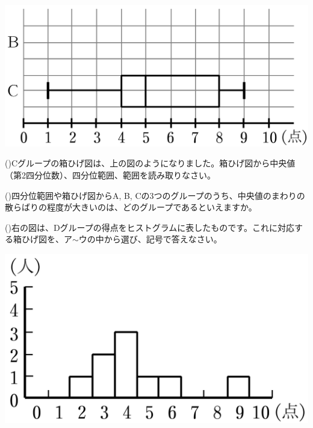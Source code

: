 \documentclass[
  12pt,a4paper,lualatex,ja=standard]{bxjsarticle}
\begin{document}
\begin{flushleft}
\begin{center}
\def\@captype{figure}
\includegraphics{img/image1.png}


\end{center}

\vspace{5mm}

()\hspace{2.5pt}Cグループの箱ひげ図は、上の図のようになりました。箱ひげ図から中央値（第2四分位数）、四分位範囲、範囲を読み取りなさい。

\vfill

()\hspace{2.5pt}四分位範囲や箱ひげ図からA, B, Cの3つのグループのうち、中央値のまわりの散らばりの程度が大きいのは、どのグループであるといえますか。

\vfill

\begin{multicols}{3}
()\hspace{2.5pt}右の図は、Dグループの得点をヒストグラムに表したものです。これに対応する箱ひげ図を、ア$\sim$ウの中から選び、記号で答えなさい。

\columnbreak

\def\@captype{figure}
\includegraphics{img/image3.png}



\end{multicols}
\end{flushleft}
\end{document}
